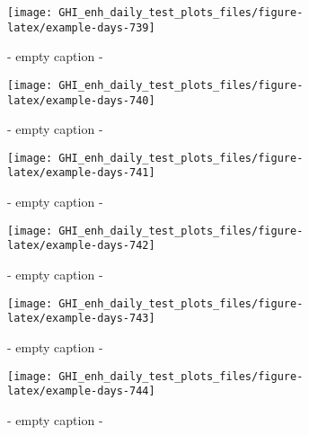 \documentclass[
  10pt,
  a4paper,oneside]{article}
\begin{document}
\begin{figure}[H]

{\centering \texttt{[image: GHI\_enh\_daily\_test\_plots\_files/figure-latex/example-days-739]} 

}

\caption{ - empty caption - }\label{fig:example-days-739}
\end{figure}

\begin{figure}[H]

{\centering \texttt{[image: GHI\_enh\_daily\_test\_plots\_files/figure-latex/example-days-740]} 

}

\caption{ - empty caption - }\label{fig:example-days-740}
\end{figure}

\begin{figure}[H]

{\centering \texttt{[image: GHI\_enh\_daily\_test\_plots\_files/figure-latex/example-days-741]} 

}

\caption{ - empty caption - }\label{fig:example-days-741}
\end{figure}

\begin{figure}[H]

{\centering \texttt{[image: GHI\_enh\_daily\_test\_plots\_files/figure-latex/example-days-742]} 

}

\caption{ - empty caption - }\label{fig:example-days-742}
\end{figure}

\begin{figure}[H]

{\centering \texttt{[image: GHI\_enh\_daily\_test\_plots\_files/figure-latex/example-days-743]} 

}

\caption{ - empty caption - }\label{fig:example-days-743}
\end{figure}

\begin{figure}[H]

{\centering \texttt{[image: GHI\_enh\_daily\_test\_plots\_files/figure-latex/example-days-744]} 

}

\caption{ - empty caption - }\label{fig:example-days-744}
\end{figure}
\end{document}

